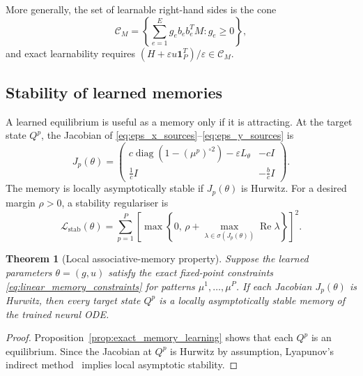 \documentclass[11pt]{article}
\newtheorem{theorem}{Theorem}
\begin{document}
More generally, the set of learnable right-hand sides is the cone
\begin{equation}
  \mathcal{C}_M
  =
  \left\{
    \sum_{e=1}^E g_e b_e b_e^T M:
    g_e\geq 0
  \right\},
  \label{eq:laplacian_learning_cone}
\end{equation}
and exact learnability requires
$(H+\varepsilon u\mathbf{1}_P^T)/\varepsilon \in \mathcal{C}_M$.

\subsection{Stability of learned memories}

A learned equilibrium is useful as a memory only if it is attracting.
At the target state $Q^p$, the Jacobian of
\eqref{eq:eps_x_sources}--\eqref{eq:eps_y_sources} is
\begin{equation}
  J_p(\theta)
  =
  \begin{pmatrix}
    c\operatorname{diag}\!\left(1-(\mu^p)^{\circ 2}\right)
    -
    \varepsilon L_\theta
    &
    -cI
    \\[4pt]
    \frac{1}{c}I
    &
    -\frac{b}{c}I
  \end{pmatrix}.
  \label{eq:learned_memory_jacobian}
\end{equation}
The memory is locally asymptotically stable if $J_p(\theta)$ is
Hurwitz. For a desired margin $\rho>0$, a stability regulariser is
\begin{equation}
  \mathcal{L}_{\mathrm{stab}}(\theta)
  =
  \sum_{p=1}^P
  \left[
    \max\left\{
      0,\,
      \rho+
      \max_{\lambda\in\sigma(J_p(\theta))}
      \operatorname{Re}\lambda
    \right\}
  \right]^2.
  \label{eq:stability_memory_loss}
\end{equation}

\begin{theorem}[Local associative-memory property]
  \label{thm:learned_memory_stability}
  Suppose the learned parameters $\theta=(g,u)$ satisfy the exact
  fixed-point constraints \eqref{eq:linear_memory_constraints} for
  patterns $\mu^1,\ldots,\mu^P$. If each Jacobian $J_p(\theta)$ is
  Hurwitz, then every target state $Q^p$ is a locally asymptotically
  stable memory of the trained neural ODE.
\end{theorem}

\begin{proof}
  Proposition~\ref{prop:exact_memory_learning} shows that each $Q^p$
  is an equilibrium. Since the Jacobian at $Q^p$ is Hurwitz by
  assumption, Lyapunov's indirect method~\cite{khalil2002} implies
  local asymptotic stability.
\end{proof}
\end{document}
